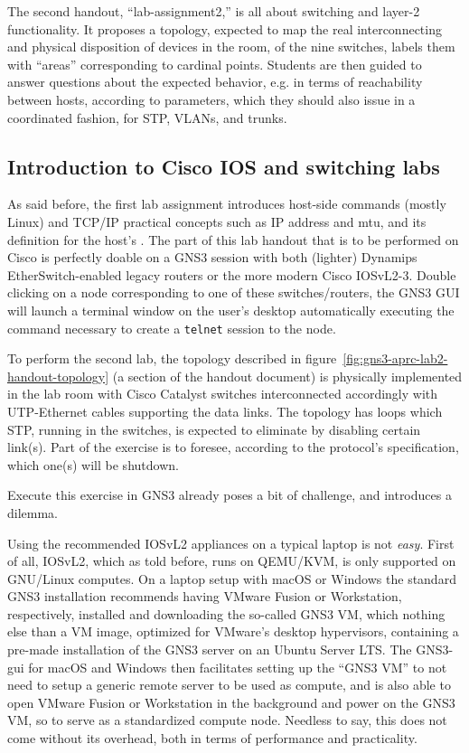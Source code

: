 The second handout, ``lab-assignment2,'' is all about switching and layer-2 functionality.
It proposes a topology, expected to map the real interconnecting and physical disposition of devices in the room, of the nine switches, labels them with ``areas'' corresponding to cardinal points.
Students are then guided to answer questions about the expected behavior, e.g. in terms of reachability between hosts, according to parameters, which they should also issue in a coordinated fashion, for STP, VLANs, and trunks.



\subsection{Introduction to Cisco IOS and switching labs}
\label{subsec:gns3introswitching}

As said before, the first lab assignment introduces host-side commands (mostly Linux) and TCP/IP practical concepts such as IP address and \acrshort{mtu}, and its definition for the host's .
The part of this lab handout that is to be performed on Cisco is perfectly doable on a GNS3 session with both (lighter) Dynamips EtherSwitch-enabled legacy routers or the more modern Cisco IOSvL2-3.
Double clicking on a node corresponding to one of these switches/routers, the GNS3 GUI will launch a terminal window on the user's desktop automatically executing the command necessary to create a \texttt{telnet} session to the node.

To perform the second lab, the topology described in figure~\ref{fig:gns3-aprc-lab2-handout-topology} (a section of the handout document) is physically implemented in the lab room with Cisco Catalyst switches interconnected accordingly with UTP-Ethernet cables supporting the data links.
The topology has loops which STP, running in the switches, is expected to eliminate by disabling certain link(s).
Part of the exercise is to foresee, according to the protocol's specification, which one(s) will be shutdown.

Execute this exercise in GNS3 already poses a bit of challenge, and introduces a dilemma.

Using the recommended IOSvL2 appliances on a typical laptop is not \emph{easy}.
First of all, IOSvL2, which as told before, runs on QEMU/KVM, is only supported on GNU/Linux computes.
On a laptop setup with macOS or Windows the standard GNS3 installation recommends having VMware Fusion or Workstation, respectively, installed and downloading the so-called GNS3 VM, which nothing else than a VM image, optimized for VMware's desktop hypervisors, containing a pre-made installation of the GNS3 server on an Ubuntu Server LTS.
The GNS3-gui for macOS and Windows then facilitates setting up the ``GNS3 VM'' to not need to setup a generic remote server to be used as compute, and is also able to open VMware Fusion or Workstation in the background and power on the GNS3 VM, so to serve as a standardized compute node.
Needless to say, this does not come without its overhead, both in terms of performance and practicality.

